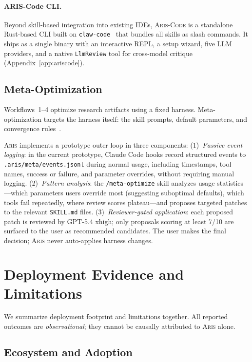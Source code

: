 \documentclass{article}
\newcommand{\aris}{\textsc{Aris}}
\newcommand{\skillmd}{\texttt{SKILL.md}}
\newcommand{\ariscode}{\textsc{Aris-Code}}
\theoremstyle{remark}
\begin{document}
\paragraph{ARIS-Code CLI.}
Beyond skill-based integration into existing IDEs, \ariscode{} is a standalone Rust-based CLI built on \texttt{claw-code}~\citep{ultraworkers2025} that bundles all skills as slash commands.
It ships as a single binary with an interactive REPL, a setup wizard, five LLM providers, and a native \texttt{LlmReview} tool for cross-model critique (Appendix~\ref{app:ariscode}).

\subsection{Meta-Optimization}
\label{sec:metaopt}

Workflows~1--4 optimize research artifacts using a fixed harness.
Meta-optimization targets the harness itself: the skill prompts, default parameters, and convergence rules~\citep{lee2026metaharness}.

\aris{} implements a prototype outer loop in three components:
(1)~\emph{Passive event logging}: in the current prototype, Claude Code hooks record structured events to \texttt{.aris/meta/events.jsonl} during normal usage, including timestamps, tool names, success or failure, and parameter overrides, without requiring manual logging.
(2)~\emph{Pattern analysis}: the \texttt{/meta-optimize} skill analyzes usage statistics---which parameters users override most (suggesting suboptimal defaults), which tools fail repeatedly, where review scores plateau---and proposes targeted patches to the relevant \skillmd{} files.
(3)~\emph{Reviewer-gated application}: each proposed patch is reviewed by GPT-5.4 xhigh; only proposals scoring at least 7/10 are surfaced to the user as recommended candidates. The user makes the final decision; \aris{} never auto-applies harness changes.
 \section{Deployment Evidence and Limitations}
\label{sec:evidence}


We summarize deployment footprint and limitations together.
All reported outcomes are \emph{observational}; they cannot be causally attributed to \aris{} alone.

\subsection{Ecosystem and Adoption}
\end{document}
